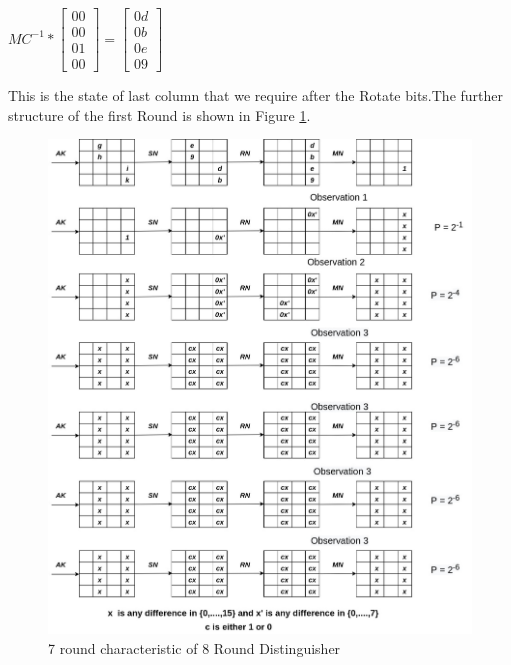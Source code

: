 \documentclass[preprint]{transcrypto}
\begin{document}
\begin{center}
\begin{math}
MC^{-1} *  
\begin{bmatrix}
00 \\
00 \\
01 \\
00
\end{bmatrix}
=
\begin{bmatrix}
0d \\
0b \\
0e \\
09
\end{bmatrix}
\end{math}    
\end{center}
This is the state of last column that we require after the Rotate bits.The further structure of the first Round is shown in Figure \ref{fig:6distinguisher}.
\begin{figure}[h!]
    \centering
    \includegraphics[width= \textwidth]{images/7round characteristic of round reduced.jpg}
    \caption{7 round characteristic of 8 Round Distinguisher}
    \label{fig:6distinguisher}
\end{figure}
\end{document}
